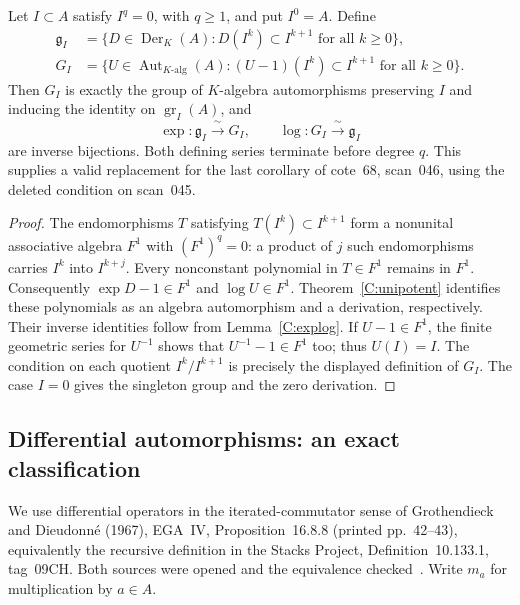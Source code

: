 \begin{theorem}
\label{C:filtered}
Let $I\subset A$ satisfy $I^q=0$, with $q\geq1$, and put $I^0=A$. Define
\begin{align*}
\mathfrak g_I&=\{D\in\operatorname{Der}_K(A):D(I^k)\subset I^{k+1}\text{ for all }k\geq0\},\\
G_I&=\{U\in\operatorname{Aut}_{K\text{-alg}}(A):(U-1)(I^k)\subset I^{k+1}\text{ for all }k\geq0\}.
\end{align*}
Then $G_I$ is exactly the group of $K$-algebra automorphisms preserving $I$ and inducing the identity on $\operatorname{gr}_I(A)$, and
\[
\exp:\mathfrak g_I\xrightarrow{\ \sim\ }G_I,
\qquad
\log:G_I\xrightarrow{\ \sim\ }\mathfrak g_I
\]
are inverse bijections. Both defining series terminate before degree $q$. This supplies a valid replacement for the last corollary of cote~68, scan~046, using the deleted condition on scan~045.
\end{theorem}
\begin{proof}
The endomorphisms $T$ satisfying $T(I^k)\subset I^{k+1}$ form a nonunital associative algebra $F^1$ with $(F^1)^q=0$: a product of $j$ such endomorphisms carries $I^k$ into $I^{k+j}$. Every nonconstant polynomial in $T\in F^1$ remains in $F^1$. Consequently $\exp D-1\in F^1$ and $\log U\in F^1$. Theorem~\ref{C:unipotent} identifies these polynomials as an algebra automorphism and a derivation, respectively. Their inverse identities follow from Lemma~\ref{C:explog}. If $U-1\in F^1$, the finite geometric series for $U^{-1}$ shows that $U^{-1}-1\in F^1$ too; thus $U(I)=I$. The condition on each quotient $I^k/I^{k+1}$ is precisely the displayed definition of $G_I$. The case $I=0$ gives the singleton group and the zero derivation.
\end{proof}

\subsection{Differential automorphisms: an exact classification}
We use differential operators in the iterated-commutator sense of Grothendieck and Dieudonn\'e (1967), EGA~IV, Proposition~16.8.8 (printed pp.~42--43), equivalently the recursive definition in the Stacks Project, Definition~10.133.1, tag~09CH. Both sources were opened and the equivalence checked~\cite{C_EGAIV4,C_Stacks09CH}. Write $m_a$ for multiplication by $a\in A$.

